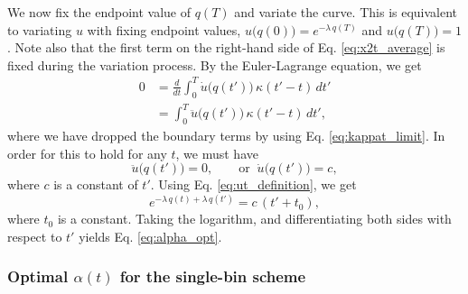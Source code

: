 \documentclass[reprint, floatfix]{revtex4-1}
\begin{document}
We now fix the endpoint value of $q(T)$
and variate the curve.
%
This is equivalent to variating $u$
with fixing endpoint values,
$u\bigl( q(0) \bigr)  = e^{-\lambda \, q(T)}$
and
$u\bigl( q(T) \bigr) = 1$.
%
Note also that the first term on the right-hand side
of Eq. \eqref{eq:x2t_average} is fixed during
the variation process.
%
%
By the Euler-Lagrange equation, we get
$$
\begin{aligned}
0
&=
\frac{d}{dt} \int_0^T
  \dot u\bigl( q(t') \bigr) \, \kappa(t' - t) \, dt'
\\
&= \int_0^T
  \ddot u\bigl( q(t') \bigr) \, \kappa(t' - t) \, dt',
\end{aligned}
$$
where we have dropped the boundary terms
by using Eq. \eqref{eq:kappat_limit}.
%
%
In order for this to hold for any $t$,
we must have
%
\begin{equation}
\ddot u\bigl( q(t') \bigr) = 0,
\qquad
\mathrm{or}
\;\;
\dot u\bigl( q(t') \bigr) = c,
\label{eq:ddu_eq_0}
\end{equation}
%
where $c$ is a constant of $t'$.
%
Using Eq. \eqref{eq:ut_definition},
we get
$$
e^{-\lambda \, q(t) + \lambda \, q(t')}
=
c \, (t' + t_0),
$$
where $t_0$ is a constant.
%
Taking the logarithm,
and differentiating both sides
with respect to $t'$
yields Eq. \eqref{eq:alpha_opt}.



\subsubsection{Optimal $\alpha(t)$ for the single-bin scheme}
\end{document}
